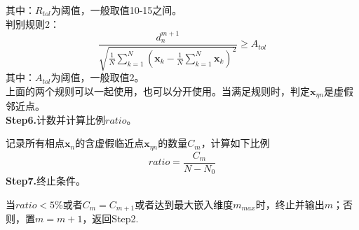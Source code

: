             其中：$R_{tol}$为阈值，一般取值10-15之间。\\
            判别规则2：
            \[
                \frac{d_n^{m+1}}{\sqrt{\frac{1}{N} \sum_{k = 1}^N (\mathbf{x}_k - \frac{1}{N} \sum_{k = 1}^N \mathbf{x}_k)^2}} \geq A_{tol}
            \]
            其中：$A_{tol}$为阈值，一般取值2。\\
            上面的两个规则可以一起使用，也可以分开使用。当满足规则时，判定$\mathbf{x}_{\eta n}$是虚假邻近点。\\
            \textbf{Step6.}计数并计算比例$ratio$。\par
            记录所有相点$\mathbf{x}_n$的含虚假临近点$\mathbf{x}_{\eta n}$的数量$C_m$，计算如下比例
            \[
                ratio = \frac{C_m}{N - N_0}
            \]
            \textbf{Step7.}终止条件。\par
            当$ratio<5 \%$或者$C_m = C_{m+1}$或者达到最大嵌入维度$m_{max}$时，终止并输出$m$；否则，置$m = m+1$，返回Step2.
